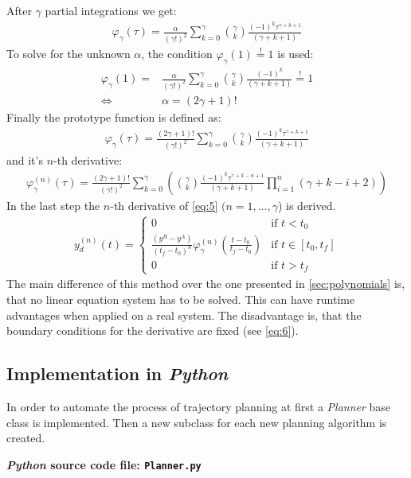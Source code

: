 \documentclass[a4paper,11pt,headings=standardclasses,parskip=half]{scrartcl}
\newcommand{\py}{\emph{Python}\xspace}
\begin{document}
After $\gamma$ partial integrations we get:
\begin{align*}
\varphi_\gamma(\tau)= \frac{\alpha}{(\gamma!)^2} \sum_{k=0}^{\gamma} \binom{\gamma}{k} \frac{(-1)^k\tau^{\gamma+k+1}}{(\gamma+k+1)}
\end{align*}
To solve for the unknown $\alpha$, the  condition $\varphi_\gamma(1)\overset{!}{=}1$ is used:
\begin{align*}
\varphi_\gamma(1)= &\frac{\alpha}{(\gamma!)^2} \sum_{k=0}^{\gamma} \binom{\gamma}{k} \frac{(-1)^k}{(\gamma+k+1)} \overset{!}{=} 1 \\
\Leftrightarrow \quad & \alpha = (2\gamma+1)!
\end{align*}
Finally the prototype function is defined as:
\begin{align}
\varphi_\gamma(\tau)= \frac{(2\gamma+1)!}{(\gamma!)^2} \sum_{k=0}^{\gamma} \binom{\gamma}{k} \frac{(-1)^k\tau^{\gamma+k+1}}{(\gamma+k+1)}
\end{align}
and it's $n$-th derivative:
\begin{align}
\varphi_\gamma^{(n)}(\tau)= \frac{(2\gamma+1)!}{(\gamma!)^2} \sum_{k=0}^{\gamma} \left(\binom{\gamma}{k} \frac{(-1)^k\tau^{\gamma+k-n+1}}{(\gamma+k+1)}\prod_{i=1}^n(\gamma+k-i+2)\right)
\end{align}
In the last step the $n$-th derivative of \eqref{eq:5} $(n=1,...,\gamma$) is derived.
\begin{align}
y_d^{(n)}(t) = \begin{cases} 0 & \textrm{if } t<t_0 \\ 
\frac{(y^B-y^A)}{(t_f-t_0)^n}\varphi_\gamma^{(n)}\left(\frac{t-t_0}{t_f-t_0}\right) &\textrm{if } t \in [t_0, t_f] \\ 
0&\textrm{if } t>t_f\end{cases}
\end{align}
The main difference of this method over the one presented in \ref{sec:polynomials} is, that no linear equation system has to be solved. This can have runtime advantages when applied on a real system. The disadvantage is, that the boundary conditions for the derivative are fixed (see \eqref{eq:6}).
\subsection{Implementation in \py}
In order to automate the process of trajectory planning at first a \emph{Planner} base class is implemented. Then a new subclass for each new planning algorithm is created.

\textbf{\py source code file: \texttt{Planner.py}}
\end{document}
